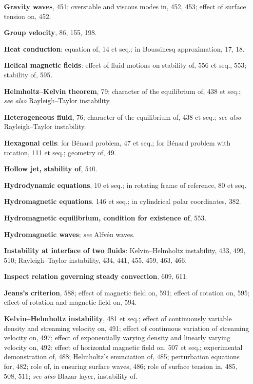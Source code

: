\begin{small}
\medskip\noindent
\textbf{Gravity waves}, 451;
  overstable and viscous modes in, 452, 453;
  effect of surface tension on, 452.

\medskip\noindent
\textbf{Group velocity}, 86, 155, 198.

\bigskip\noindent
\textbf{Heat conduction}:
  equation of, 14 et seq.;
  in Boussinesq approximation, 17, 18.

\medskip\noindent
\textbf{Helical magnetic fields}:
  effect of fluid motions on stability of,
    556 et seq., 553;
  stability of, 595.

\medskip\noindent
\textbf{Helmholtz--Kelvin theorem}, 79;
  character of the equilibrium of, 438 et
    seq.;
  \textit{see also} Rayleigh--Taylor instability.

\medskip\noindent
\textbf{Heterogeneous fluid}, 76;
  character of the equilibrium of, 438 et
    seq.;
  \textit{see also} Rayleigh--Taylor instability.

\medskip\noindent
\textbf{Hexagonal cells}:
  for B\'enard problem, 47 et seq.;
  for B\'enard problem with rotation, 111
    et seq.;
  geometry of, 49.

\medskip\noindent
\textbf{Hollow jet, stability of}, 540.

\medskip\noindent
\textbf{Hydrodynamic equations}, 10 et seq.;
  in rotating frame of reference, 80 et seq.

\medskip\noindent
\textbf{Hydromagnetic equations}, 146 et seq.;
  in cylindrical polar coordinates, 382.

\medskip\noindent
\textbf{Hydromagnetic equilibrium, condition for
  existence of}, 553.

\medskip\noindent
\textbf{Hydromagnetic waves}; \textit{see} Alfv\'en waves.

\bigskip\noindent
\textbf{Instability at interface of two fluids}:
  Kelvin--Helmholtz instability, 433, 499,
    510;
  Rayleigh--Taylor instability, 434, 441,
    455, 459, 463, 466.

\medskip\noindent
\textbf{Inspect relation governing steady convection}, 609, 611.

\medskip\noindent
\textbf{Jeans's criterion}, 588;
  effect of magnetic field on, 591;
  effect of rotation on, 595;
  effect of rotation and magnetic field on,
    594.

\bigskip\noindent
\textbf{Kelvin--Helmholtz instability}, 481 et seq.;
  effect of continuously variable density
    and streaming velocity on, 491;
  effect of continuous variation of streaming velocity on, 497;
  effect of exponentially varying density
    and linearly varying velocity on, 492;
  effect of horizontal magnetic field on,
    507 et seq.;
  experimental demonstration of, 488;
  Helmholtz's enunciation of, 485;
  perturbation equations for, 482;
  role of, in ensuring surface waves, 486;
  role of surface tension in, 485, 508, 511;
  \textit{see also} Blazar layer, instability of.


\end{small}
